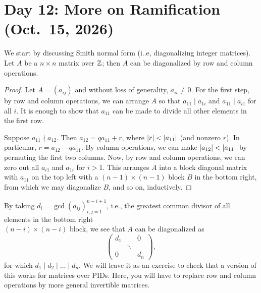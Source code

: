 \section{Day 12: More on Ramification (Oct.\ 15, 2026)}
We start by discussing Smith normal form (i..e, diagonalizing integer matrices). Let $A$ be a $n \times n$ matrix over $\mathbb Z$; then $A$ can be diagonalized by row and column operations.
\begin{proof}
    Let $A = (a_{ij})$ and without loss of generality, $a_{ii} \neq 0$. For the first step, by row and column operations, we can arrange $A$ so that $a_{11} \mid a_{1i}$ and $a_{11} \mid a_{i1}$ for all $i$. It is enough to show that $a_{11}$ can be made to divide all other elements in the first row.

    Suppose $a_{11} \nmid a_{12}$. Then $a_{12} = q a_{11} + r$, where $\left\lvert r \right\rvert < \left\lvert a_{11} \right\rvert$ (and nonzero $r$). In particular, $r = a_{12} - q a_{11}$. By column operations, we can make $\left\lvert a_{12} \right\rvert < \left\lvert a_{11} \right\rvert$ by permuting the first two columns. Now, by row and column operations, we can zero out all $a_{i1}$ and $a_{1i}$ for $i > 1$. This arranges $A$ into a block diagonal matrix with $a_{11}$ on the top left with a $(n-1) \times (n-1)$ block $B$ in the bottom right, from which we may diagonalize $B$, and so on, inductively.
\end{proof}

By taking $d_i = \gcd(a_{ij})_{i,j=1}^{n-i+1}$, i.e., the greatest common divisor of all elements in the bottom right \\ $(n-i) \times (n-i)$ block, we see that $A$ can be diagonalized as
\[ \begin{pmatrix} d_1 & & 0 \\ & \ddots \\ 0 & & d_n \end{pmatrix}, \]
for which $d_1 \mid d_2 \mid \dots \mid d_n$. We will leave it as an exercise to check that a version of this works for matrices over PIDs. Here, you will have to replace row and column operations by more general invertible matrices.

